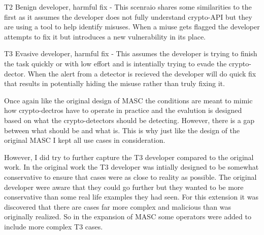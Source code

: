 T2 Benign developer, harmful fix - This scenraio shares some similarities to the first as it assumes the developer does not fully understand crypto-API but they are using a tool to help identify misuses. When a miuse gets flagged the developer attempts to fix it but introduces a new vulnerability in its place.

T3 Evasive developer, harmful fix - This assumes the developer is trying to finish the task quickly or with low effort and is intentially trying to evade the crypto-dector. When the alert from a detector is recieved the developer will do quick fix that results in potentially hiding the misuse rather than truly fixing it.

Once again like the original design of MASC the conditions are meant to mimic how crypto-dectros have to operate in practice and the evalution is designed based on what the crypto-detectors should be detecting. However, there is a gap between what should be and what is. This is why just like the design of the original MASC I kept all use cases in consideration. 

However, I did try to further capture the T3 developer compared to the original work. In the original work the T3 developer was intially designed to be somewhat conservative to ensure that cases were as close to reality as possible. The original developer were aware that they could go further but they wanted to be more conservative than some real life examples they had seen. For this extension it was discovered that there are cases far more complex and malicious than was originally realized. So in the expansion of MASC some operators were added to include more complex T3 cases.
